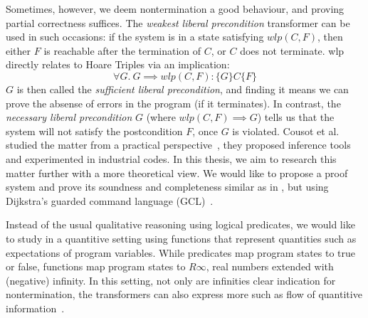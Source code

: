 Sometimes, however, we deem nontermination a good behaviour, and proving partial correctness suffices. 
The \textit{weakest liberal precondition} transformer \cite{Dijkstra1990} can be used in such occasions: 
if the system is in a state satisfying $wlp(C,F)$, then either $F$ is reachable after the termination of $C$, or $C$ does not terminate.
wlp directly relates to Hoare Triples via an implication: 
\[\forall G.\ G\implies wlp(C,F): \{G\} C \{F\}\]
$G$ is then called the \textit{sufficient liberal precondition}, and finding it means we can prove the absense of errors in the program (if it terminates). 
In contrast, the \textit{necessary liberal precondition} $G$ (where $ wlp(C,F)\implies G$) tells us that the system will not satisfy the postcondition $F$, once $G$ is violated. 
Cousot et al. studied the matter from a practical perspective~\cite{Cousot2013}, they proposed inference tools and experimented in industrial codes.
In this thesis, we aim to research this matter further with a more theoretical view. 
We would like to propose a proof system and prove its soundness and completeness similar as in \cite{Vries2011}, but using Dijkstra's guarded command language (GCL)~\cite{Dijkstra1975}. 

Instead of the usual qualitative reasoning using logical predicates, we would like to study in a quantitive setting using functions that represent quantities such as expectations of program variables. 
While predicates map program states to true or false, functions map program states to $R\infty$, real numbers extended with (negative) infinity. 
In this setting, not only are infinities clear indication for nontermination, the transformers can also express more such as flow of quantitive information~\cite{Zhang2022}.





